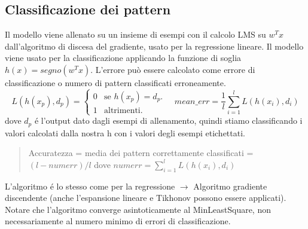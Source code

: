 \documentclass{article}
\begin{document}
\subsection{Classificazione dei pattern}
Il modello viene allenato su un insieme di esempi con il calcolo LMS su $w^Tx$ dall'algoritmo di discesa del gradiente, usato per la regressione lineare. Il modello viene usato per la classificazione applicando la funzione di soglia $h(x)=segno(w^Tx)$. L'errore può essere calcolato come errore di classificazione o numero di pattern classificati erroneamente. 
\begin{equation}
  L(h(x_p),d_p)=\begin{cases}
    0 & \text{se $h(x_p)=d_p$}.\\
    1 & \text{altrimenti}.
  \end{cases}
  \quad mean\_err = \frac{1}{l}\sum_{i=1}^l L(h(x_i), d_i)
\end{equation}
dove $d_p$ é l'output dato dagli esempi di allenamento, quindi stiamo classificando i valori calcolati dalla nostra h con i valori degli esempi etichettati.
\begin{quote}
    Accuratezza = media dei pattern correttamente classificati = $(l-numerr)/l$ \newline dove $numerr=\sum_{i=1}^l L(h(x_i), d_i)$
\end{quote}
L'algoritmo é lo stesso come per la regressione $\rightarrow$ Algoritmo gradiente discendente (anche l'espansione lineare e Tikhonov possono essere applicati). Notare che l'algoritmo converge asintoticamente al MinLeastSquare, non necessariamente al numero minimo di errori di classificazione.
\end{document}
